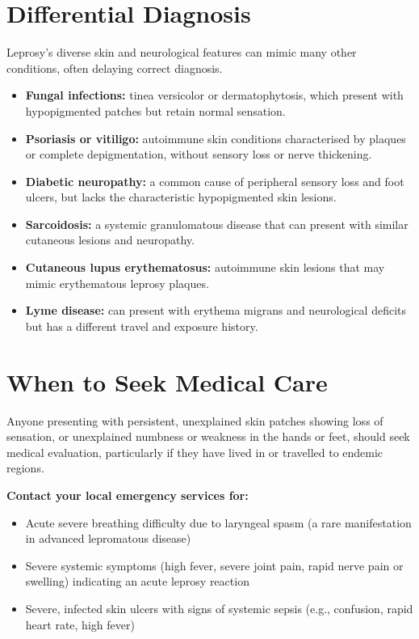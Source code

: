 \section*{Differential Diagnosis}
Leprosy's diverse skin and neurological features can mimic many other conditions, often delaying correct diagnosis.
\begin{itemize}
    \item \textbf{Fungal infections:} tinea versicolor or dermatophytosis, which present with hypopigmented patches but retain normal sensation.
    \item \textbf{Psoriasis or vitiligo:} autoimmune skin conditions characterised by plaques or complete depigmentation, without sensory loss or nerve thickening.
    \item \textbf{Diabetic neuropathy:} a common cause of peripheral sensory loss and foot ulcers, but lacks the characteristic hypopigmented skin lesions.
    \item \textbf{Sarcoidosis:} a systemic granulomatous disease that can present with similar cutaneous lesions and neuropathy.
    \item \textbf{Cutaneous lupus erythematosus:} autoimmune skin lesions that may mimic erythematous leprosy plaques.
    \item \textbf{Lyme disease:} can present with erythema migrans and neurological deficits but has a different travel and exposure history.
\end{itemize}

\section*{When to Seek Medical Care}
Anyone presenting with persistent, unexplained skin patches showing loss of sensation, or unexplained numbness or weakness in the hands or feet, should seek medical evaluation, particularly if they have lived in or travelled to endemic regions.

\textbf{Contact your local emergency services for:}
\begin{itemize}
    \item Acute severe breathing difficulty due to laryngeal spasm (a rare manifestation in advanced lepromatous disease)
    \item Severe systemic symptoms (high fever, severe joint pain, rapid nerve pain or swelling) indicating an acute leprosy reaction
    \item Severe, infected skin ulcers with signs of systemic sepsis (e.g., confusion, rapid heart rate, high fever)
\end{itemize}

